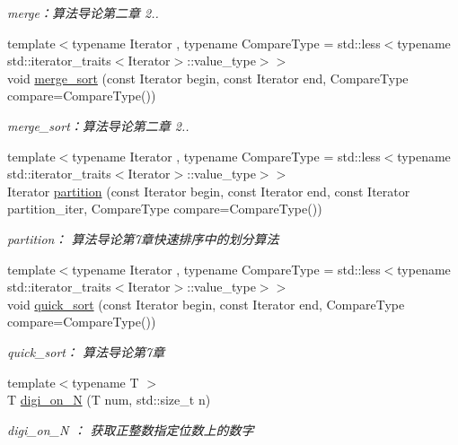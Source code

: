\begin{DoxyCompactItemize}
\begin{DoxyCompactList}\small\item\em merge：算法导论第二章 2.. \end{DoxyCompactList}\item 
{\footnotesize template$<$typename Iterator , typename Compare\+Type  = std\+::less$<$typename std\+::iterator\+\_\+traits$<$\+Iterator$>$\+::value\+\_\+type$>$$>$ }\\void \hyperlink{namespace_introduction_to_algorithm_1_1_sort_algorithm_a38dce6f6996c858aef1096d75bb785db}{merge\+\_\+sort} (const Iterator begin, const Iterator end, Compare\+Type compare=Compare\+Type())
\begin{DoxyCompactList}\small\item\em merge\+\_\+sort：算法导论第二章 2.. \end{DoxyCompactList}\item 
{\footnotesize template$<$typename Iterator , typename Compare\+Type  = std\+::less$<$typename std\+::iterator\+\_\+traits$<$\+Iterator$>$\+::value\+\_\+type$>$$>$ }\\Iterator \hyperlink{namespace_introduction_to_algorithm_1_1_sort_algorithm_a3a2d13a83cd168d9a10df0ed8c39f9ee}{partition} (const Iterator begin, const Iterator end, const Iterator partition\+\_\+iter, Compare\+Type compare=Compare\+Type())
\begin{DoxyCompactList}\small\item\em partition： 算法导论第7章快速排序中的划分算法 \end{DoxyCompactList}\item 
{\footnotesize template$<$typename Iterator , typename Compare\+Type  = std\+::less$<$typename std\+::iterator\+\_\+traits$<$\+Iterator$>$\+::value\+\_\+type$>$$>$ }\\void \hyperlink{namespace_introduction_to_algorithm_1_1_sort_algorithm_aa304e98b87d7ec1c17bd5cae534fb666}{quick\+\_\+sort} (const Iterator begin, const Iterator end, Compare\+Type compare=Compare\+Type())
\begin{DoxyCompactList}\small\item\em quick\+\_\+sort： 算法导论第7章 \end{DoxyCompactList}\item 
{\footnotesize template$<$typename T $>$ }\\T \hyperlink{namespace_introduction_to_algorithm_1_1_sort_algorithm_a563e87041fc859e7bafe4a11a790dec2}{digi\+\_\+on\+\_\+\+N} (T num, std\+::size\+\_\+t n)
\begin{DoxyCompactList}\small\item\em digi\+\_\+on\+\_\+\+N ： 获取正整数指定位数上的数字 \end{DoxyCompactList}\item 

\end{DoxyCompactItemize}
